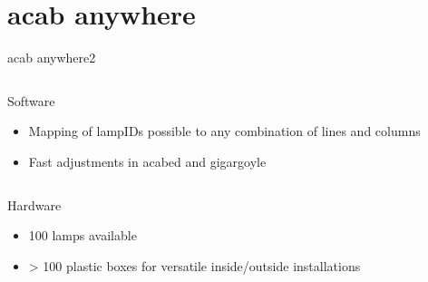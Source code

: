 \documentclass{beamer}
\begin{document}
\section{acab anywhere}
  \begin{frame}{acab anywhere}2
  \begin{columns}
    \begin{column}{5cm}
      Software
      \begin{itemize}
      \item Mapping of lampIDs possible to any combination of lines and columns\\
      \item Fast adjustments in acabed and gigargoyle
      \end{itemize}
    \end{column}
  \end{columns}
  \begin{columns}
    \begin{column}{5cm}
    Hardware
      \begin{itemize}
      \item 100 lamps available
      \item > 100 plastic boxes for versatile inside/outside installations
      \end{itemize}
    \end{column}
  \end{columns}
\end{frame}
\end{document}
